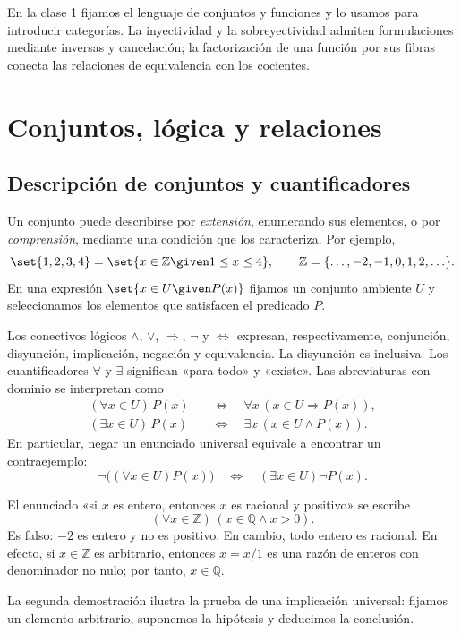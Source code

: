 En la clase 1 fijamos el lenguaje de conjuntos y funciones y lo usamos para introducir categorías. La inyectividad y la sobreyectividad admiten formulaciones mediante inversas y cancelación; la factorización de una función por sus fibras conecta las relaciones de equivalencia con los cocientes.

\section{Conjuntos, lógica y relaciones}
\subsection{Descripción de conjuntos y cuantificadores}
Un conjunto puede describirse por \emph{extensión}, enumerando sus elementos, o por \emph{comprensión}, mediante una condición que los caracteriza. Por ejemplo,
\[
\set{1,2,3,4}=\set{x\in\mathbb Z\given1\le x\le4},
\qquad \mathbb Z=\{\ldots,-2,-1,0,1,2,\ldots\}.
\]
En una expresión $\set{x\in U\given P(x)}$ fijamos un conjunto ambiente $U$ y seleccionamos los elementos que satisfacen el predicado $P$.

Los conectivos lógicos $\land$, $\lor$, $\Rightarrow$, $\neg$ y $\Leftrightarrow$ expresan, respectivamente, conjunción, disyunción, implicación, negación y equivalencia. La disyunción es inclusiva. Los cuantificadores $\forall$ y $\exists$ significan «para todo» y «existe». Las abreviaturas con dominio se interpretan como
\[
\begin{aligned}
(\forall x\in U)\,P(x)&\quad\Longleftrightarrow\quad
\forall x\,(x\in U\Rightarrow P(x)),\\
(\exists x\in U)\,P(x)&\quad\Longleftrightarrow\quad
\exists x\,(x\in U\land P(x)).
\end{aligned}
\]
En particular, negar un enunciado universal equivale a encontrar un contraejemplo:
\[
\neg\bigl((\forall x\in U)P(x)\bigr)
\quad\Longleftrightarrow\quad (\exists x\in U)\neg P(x).
\]

\begin{ejem}
El enunciado «si $x$ es entero, entonces $x$ es racional y positivo» se escribe
\[
(\forall x\in\mathbb Z)\,(x\in\mathbb Q\land x>0).
\]
Es falso: $-2$ es entero y no es positivo. En cambio, todo entero es racional. En efecto, si $x\in\mathbb Z$ es arbitrario, entonces $x=x/1$ es una razón de enteros con denominador no nulo; por tanto, $x\in\mathbb Q$.
\end{ejem}
La segunda demostración ilustra la prueba de una implicación universal: fijamos un elemento arbitrario, suponemos la hipótesis y deducimos la conclusión.

